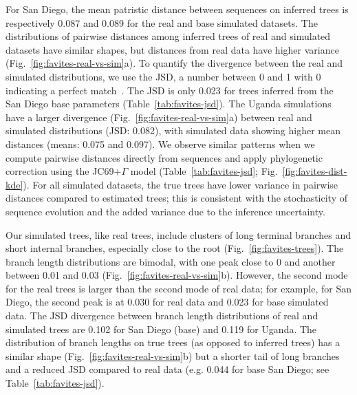 For San Diego, the mean patristic distance between sequences on inferred trees is respectively 0.087 and 0.089 for the real and base simulated datasets. The distributions of pairwise distances among inferred trees of real and simulated datasets have similar shapes, but distances from real data have higher variance (Fig.~\ref{fig:favites-real-vs-sim}a). To quantify the divergence between the real and simulated distributions, we use the \gls{JSD}, a number between 0 and 1 with 0 indicating a perfect match~\cite{Lin1991}. The \gls{JSD} is only 0.023 for trees inferred from the San Diego base parameters (Table~\ref{tab:favites-jsd}). The Uganda simulations have a larger divergence (Fig.~\ref{fig:favites-real-vs-sim}a) between real and simulated distributions (\gls{JSD}: 0.082), with simulated data showing higher mean distances (means: 0.075 and 0.097). We observe similar patterns when we compute pairwise distances directly from sequences and apply phylogenetic correction using the \gls{JC69}+$\Gamma$ model (Table~\ref{tab:favites-jsd}; Fig.~\ref{fig:favites-dist-kde}). For all simulated datasets, the true trees have lower variance in pairwise distances compared to estimated trees; this is consistent with the stochasticity of sequence evolution and the added variance due to the inference uncertainty.

Our simulated trees, like real trees, include clusters of long terminal branches and short internal branches, especially close to the root (Fig.~\ref{fig:favites-trees}). The branch length distributions are bimodal, with one peak close to 0 and another between 0.01 and 0.03 (Fig.~\ref{fig:favites-real-vs-sim}b). However, the second mode for the real trees is larger than the second mode of real data; for example, for San Diego, the second peak is at 0.030 for real data and 0.023 for base simulated data. The JSD divergence between branch length distributions of real and simulated trees are 0.102 for San Diego (base) and 0.119 for Uganda. The distribution of branch lengths on true trees (as opposed to inferred trees) has a similar shape (Fig.~\ref{fig:favites-real-vs-sim}b) but a shorter tail of long branches and a reduced JSD compared to real data (e.g. 0.044 for base San Diego; see Table~\ref{tab:favites-jsd}).

